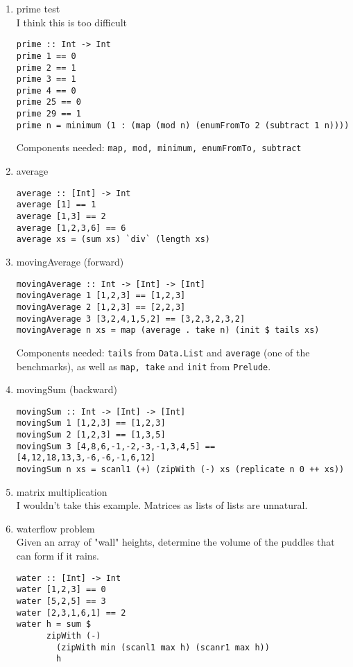 \begin{enumerate}
%
	\item prime test \\
	I think this is too difficult
	\begin{lstlisting}
prime :: Int -> Int
prime 1 == 0
prime 2 == 1
prime 3 == 1
prime 4 == 0
prime 25 == 0
prime 29 == 1
prime n = minimum (1 : (map (mod n) (enumFromTo 2 (subtract 1 n))))
	\end{lstlisting}
	Components needed: \lstinline?map, mod, minimum, enumFromTo, subtract?
%
	\item average
	\begin{lstlisting}
average :: [Int] -> Int
average [1] == 1
average [1,3] == 2
average [1,2,3,6] == 6
average xs = (sum xs) `div` (length xs)
	\end{lstlisting}
%
	\item movingAverage (forward)
	\begin{lstlisting}
movingAverage :: Int -> [Int] -> [Int]
movingAverage 1 [1,2,3] == [1,2,3]
movingAverage 2 [1,2,3] == [2,2,3]
movingAverage 3 [3,2,4,1,5,2] == [3,2,3,2,3,2]
movingAverage n xs = map (average . take n) (init $ tails xs)
	\end{lstlisting}
	Components needed: \lstinline?tails? from \lstinline?Data.List? and  \lstinline?average? (one of the benchmarks), as well as \lstinline?map, take? and \lstinline?init? from \lstinline?Prelude?.
%
	\item movingSum (backward)
	\begin{lstlisting}
movingSum :: Int -> [Int] -> [Int]
movingSum 1 [1,2,3] == [1,2,3]
movingSum 2 [1,2,3] == [1,3,5]
movingSum 3 [4,8,6,-1,-2,-3,-1,3,4,5] == [4,12,18,13,3,-6,-6,-1,6,12]
movingSum n xs = scanl1 (+) (zipWith (-) xs (replicate n 0 ++ xs))
	\end{lstlisting}
%
	\item matrix multiplication \\
	I wouldn't take this example. Matrices as lists of lists are unnatural. \\
%
	\item waterflow problem \\
	Given an array of "wall" heights, determine the volume of the puddles that can form if it rains.
	\begin{lstlisting}
water :: [Int] -> Int
water [1,2,3] == 0
water [5,2,5] == 3
water [2,3,1,6,1] == 2
water h = sum $ 
      zipWith (-) 
        (zipWith min (scanl1 max h) (scanr1 max h))
        h
	\end{lstlisting}

\end{enumerate}
